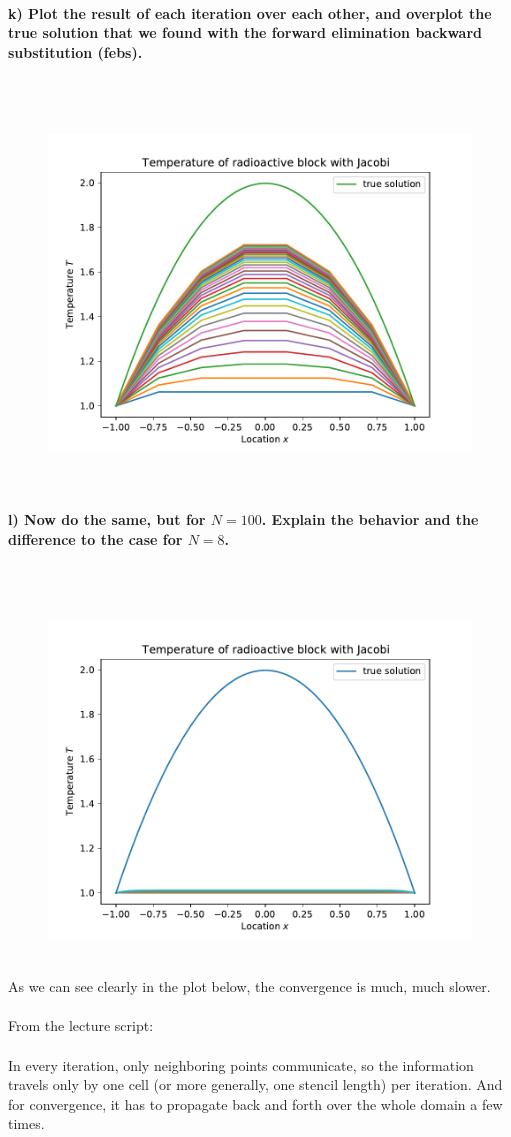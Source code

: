 \newpage
\paragraph{
    k) Plot the result of each iteration over each other, and overplot
    the true solution that we found with the forward elimination
    backward substitution (febs).
} \ \\
    \\
    \begin{figure}[h!]  
        \centering
        \includegraphics[width=.7\textwidth]{../figures/Aufg1k.pdf}
    \end{figure} \ \\

\newpage
\paragraph{
    l) Now do the same, but for $N=100$. Explain the behavior and the
    difference to the case for $N=8$.
} \ \\
    \\
    \begin{figure}[h!]
        \centering
        \includegraphics[width=.7\textwidth]{../figures/Aufg1l.pdf}
    \end{figure} \ \\
    As we can see clearly in the plot below, the convergence is much, 
    much slower. \\
    \\
    From the lecture script: \\
    \\ 
    In every iteration, only neighboring points communicate, so the 
    information travels only by one cell (or more generally, one 
    stencil length) per iteration. And for convergence, it has to 
    propagate back and forth over the whole domain a few times.

